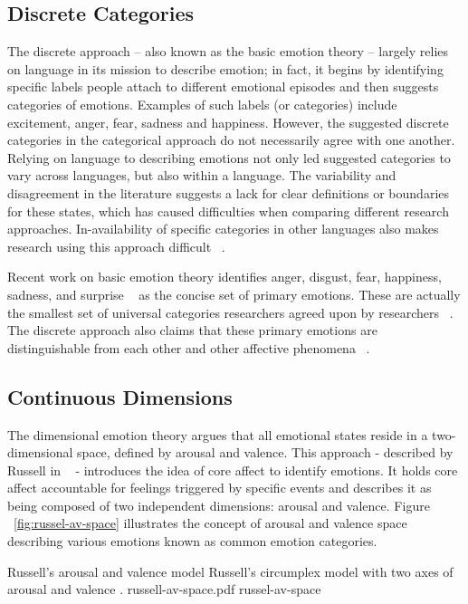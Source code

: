 \subsection{Discrete Categories}
The discrete approach – also known as the basic emotion theory – largely relies on language in its mission to describe emotion; in fact, it begins by identifying specific labels people attach to different emotional episodes and then suggests categories of emotions. Examples of such labels (or categories) include excitement, anger, fear, sadness and happiness. However, the suggested discrete categories in the categorical approach do not necessarily agree with one another. Relying on language to describing emotions not only led suggested categories to vary across languages, but also within a language. The variability and disagreement in the literature suggests a lack for clear definitions or boundaries for these states, which has caused difficulties when comparing different research approaches. In-availability of specific categories in other languages also makes research using this approach difficult ~\cite{zimmermann2006extending}.

Recent work on basic emotion theory identifies anger, disgust, fear, happiness, sadness, and surprise ~\cite{peter2006emotion} as the concise set of primary emotions. These are actually the smallest set of universal categories researchers agreed upon by researchers ~\cite{zagalo2004story}. The discrete approach also claims that these primary emotions are distinguishable from each other and other affective phenomena ~\cite{dalgleish1999handbook}.

\subsection{Continuous Dimensions}

The dimensional emotion theory argues that all emotional states reside in a two-dimensional space, defined by arousal and valence. This approach - described by Russell in ~\cite{russell2003core} - introduces the idea of core affect to identify emotions. It holds core affect accountable for feelings triggered by specific events and describes it as being composed of two independent dimensions: arousal and valence. Figure ~\ref{fig:russel-av-space} illustrates the concept of arousal and valence space describing various emotions known as common emotion categories.

\img
{Russell's arousal and valence model}
{Russell's circumplex model with two axes of arousal and valence \footnotemark.}
{russell-av-space.pdf}
{russel-av-space}

